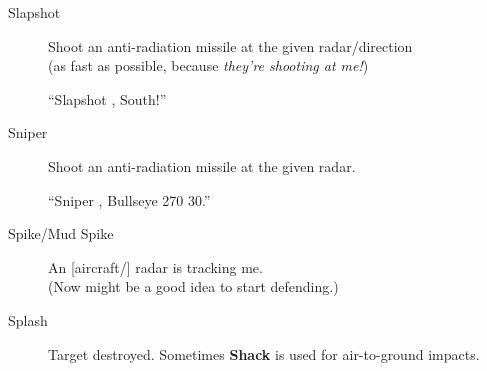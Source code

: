 \begin{description}
\item[Slapshot] Shoot an anti-radiation missile at the given radar/direction \\
    (as fast as possible, because \emph{they're shooting at me!})

    ``Slapshot , South!''

\item[Sniper] Shoot an anti-radiation missile at the given  radar.

    ``Sniper , Bullseye 270 30.''

\item[Spike/Mud Spike] An [aircraft/] radar is tracking me. \\
    (Now might be a good idea to start defending.)

\item[Splash] Target destroyed. Sometimes \textbf{Shack} is used for
    air-to-ground impacts.

\end{description}
